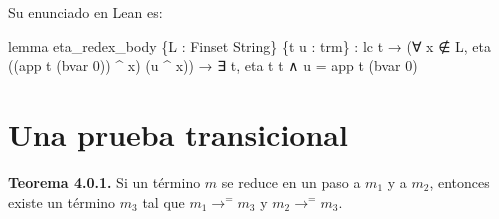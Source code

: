 \documentclass[
  spanish,
  letterpaper,
  DIV=11,
  numbers=noendperiod]{scrreprt}
\newenvironment{Shaded}{\begin{snugshade}}{\end{snugshade}}
\newcommand{\KeywordTok}[1]{\textcolor[rgb]{0.00,0.23,0.31}{\textbf{#1}}}
\newcommand{\NormalTok}[1]{\textcolor[rgb]{0.00,0.23,0.31}{#1}}
\renewcommand{\NormalTok}[1]{\textcolor[HTML]{000000}{#1}}
\renewcommand{\KeywordTok}[1]{\textcolor[HTML]{0000FF}{#1}}
\theoremstyle{remark}
\begin{document}
Su enunciado en Lean es:

\begin{Shaded}
\begin{Highlighting}[]
\KeywordTok{lemma}\NormalTok{ eta\_redex\_body \{L : Finset String\} \{t u : trm\} :}
\NormalTok{    lc t →}
\NormalTok{    (∀ x ∉ L, eta ((app t (bvar 0)) \^{} x) (u \^{} x)) →}
\NormalTok{    ∃ t\textquotesingle{}, eta t t\textquotesingle{} ∧ u = app t\textquotesingle{} (bvar 0)}
\end{Highlighting}
\end{Shaded}


\chapter{Una prueba transicional}\label{una-prueba-transicional}

\textbf{Teorema 4.0.1.} Si un término \(m\) se reduce en un paso a
\(m_1\) y a \(m_2\), entonces existe un término \(m_3\) tal que
\(m_1\longrightarrow^{=}m_3\) y \(m_2\longrightarrow^{=}m_3\).
\end{document}
